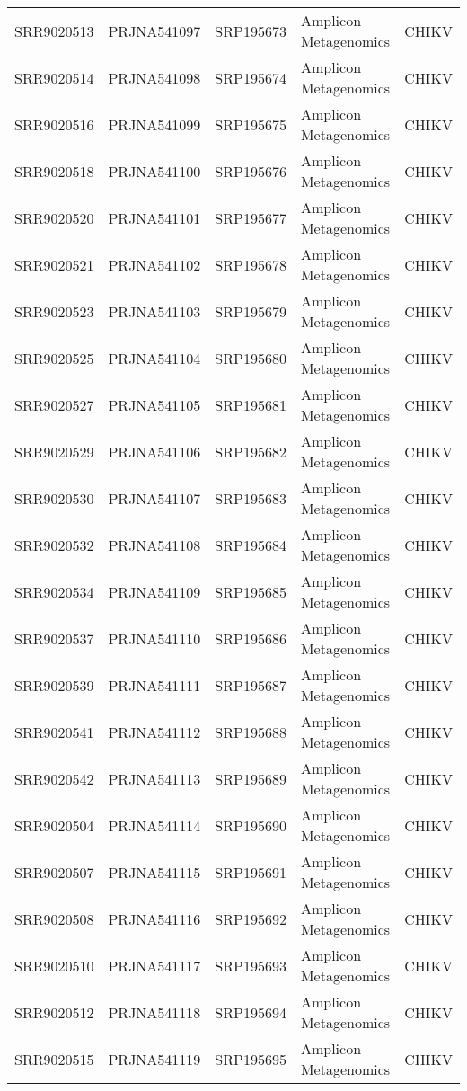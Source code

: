 \begin{scriptsize}
\begin{center}
\begin{longtable}{@{}lllll@{}}
SRR9020513 & PRJNA541097 & SRP195673 & Amplicon Metagenomics & CHIKV    \\
SRR9020514 & PRJNA541098 & SRP195674 & Amplicon Metagenomics & CHIKV    \\
SRR9020516 & PRJNA541099 & SRP195675 & Amplicon Metagenomics & CHIKV    \\
SRR9020518 & PRJNA541100 & SRP195676 & Amplicon Metagenomics & CHIKV    \\
SRR9020520 & PRJNA541101 & SRP195677 & Amplicon Metagenomics & CHIKV    \\
SRR9020521 & PRJNA541102 & SRP195678 & Amplicon Metagenomics & CHIKV    \\
SRR9020523 & PRJNA541103 & SRP195679 & Amplicon Metagenomics & CHIKV    \\
SRR9020525 & PRJNA541104 & SRP195680 & Amplicon Metagenomics & CHIKV    \\
SRR9020527 & PRJNA541105 & SRP195681 & Amplicon Metagenomics & CHIKV    \\
SRR9020529 & PRJNA541106 & SRP195682 & Amplicon Metagenomics & CHIKV    \\
SRR9020530 & PRJNA541107 & SRP195683 & Amplicon Metagenomics & CHIKV    \\
SRR9020532 & PRJNA541108 & SRP195684 & Amplicon Metagenomics & CHIKV    \\
SRR9020534 & PRJNA541109 & SRP195685 & Amplicon Metagenomics & CHIKV    \\
SRR9020537 & PRJNA541110 & SRP195686 & Amplicon Metagenomics & CHIKV    \\
SRR9020539 & PRJNA541111 & SRP195687 & Amplicon Metagenomics & CHIKV    \\
SRR9020541 & PRJNA541112 & SRP195688 & Amplicon Metagenomics & CHIKV    \\
SRR9020542 & PRJNA541113 & SRP195689 & Amplicon Metagenomics & CHIKV    \\
SRR9020504 & PRJNA541114 & SRP195690 & Amplicon Metagenomics & CHIKV    \\
SRR9020507 & PRJNA541115 & SRP195691 & Amplicon Metagenomics & CHIKV    \\
SRR9020508 & PRJNA541116 & SRP195692 & Amplicon Metagenomics & CHIKV    \\
SRR9020510 & PRJNA541117 & SRP195693 & Amplicon Metagenomics & CHIKV    \\
SRR9020512 & PRJNA541118 & SRP195694 & Amplicon Metagenomics & CHIKV    \\
SRR9020515 & PRJNA541119 & SRP195695 & Amplicon Metagenomics & CHIKV    \\

\end{longtable}
\end{center}
\end{scriptsize}
